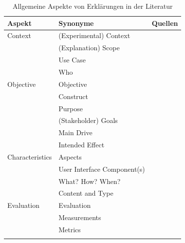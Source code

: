 \begin{longtable}{|p{}|p{}|p{}|}
    \hline
    \textbf{Aspekt}          & \textbf{Synonyme} & \textbf{Quellen} \\ \hline
    Context         & (Experimental) Context & \cite{chazette_knowledge_nodate} \cite{chazette_end-users_nodate} \cite{sato_context_nodate} \cite{waa_evaluating_2021} \cite{kohl_explainability_2019} \cite{neerincx_using_2018} \cite{sovrano_modelling_2020} \cite{doshi2017towards} \\
                    & (Explanation) Scope & \cite{wohlin2012experimentation} \cite{eiband_impact_2019} \cite{doshi2017towards} \\
                    & Use Case & \cite{waa_evaluating_2021} \\
                    & Who & \cite{rosenfeld_explainability_2019} \\
    \hline
    Objective       & Objective & \cite{nunes_systematic_2017} \\
                    & Construct & \cite{waa_evaluating_2021} \\
                    & Purpose & \cite{nunes_systematic_2017} \cite{wohlin2012experimentation} \\
                    & (Stakeholder) Goals & \cite{cirqueira_scenario-based_2020} \cite{sovrano_modelling_2020} \cite{ribera2019can} \\
                    & Main Drive & \cite{anjomshoae2019explainable} \\
                    & Intended Effect & \cite{balog_measuring_2020} \\
    \hline
    Characteristics & Aspects       & \cite{rosenfeld_explainability_2019} \\
                    & User Interface Component(s) & \cite{nunes_systematic_2017} \cite{rosenfeld_explainability_2019} \\
                    & What? How? When? & \cite{rosenfeld_explainability_2019} \\
                    & Content and Type & \cite{ribera2019can} \\
    \hline
    Evaluation      & Evaluation    & \cite{kohl_explainability_2019} \cite{doshi2017towards} \\
                    & Measurements  & \cite{waa_evaluating_2021} \cite{balog_measuring_2020} \\
                    & Metrics       & \cite{nunes_systematic_2017} \cite{anjomshoae2019explainable} \cite{chari_explanation_2020} \cite{waa_evaluating_2021}\\
    \hline
\caption{Allgemeine Aspekte von Erklärungen in der Literatur}
\label{tab:model_explaination_aspects}
\end{longtable}

